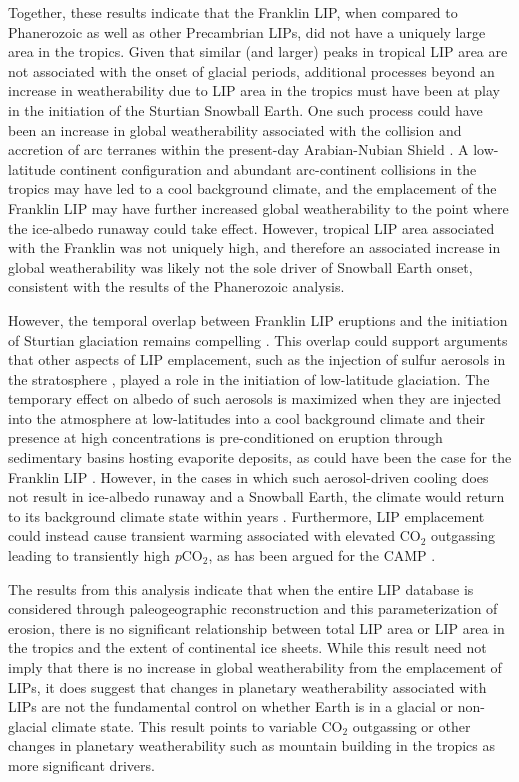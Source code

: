 \documentclass[11pt,letterpaper]{article}
\begin{document}
Together, these results indicate that the Franklin LIP, when compared to Phanerozoic as well as other Precambrian LIPs, did not have a uniquely large area in the tropics. Given that similar (and larger) peaks in tropical LIP area are not associated with the onset of glacial periods, additional processes beyond an increase in weatherability due to LIP area in the tropics must have been at play in the initiation of the Sturtian Snowball Earth. One such process could have been an increase in global weatherability associated with the collision and accretion of arc terranes within the present-day Arabian-Nubian Shield \citep{Park2018a}. A low-latitude continent configuration and abundant arc-continent collisions in the tropics may have led to a cool background climate, and the emplacement of the Franklin LIP may have further increased global weatherability to the point where the ice-albedo runaway could take effect. However, tropical LIP area associated with the Franklin was not uniquely high, and therefore an associated increase in global weatherability was likely not the sole driver of Snowball Earth onset, consistent with the results of the Phanerozoic analysis.

However, the temporal overlap between Franklin LIP eruptions and the initiation of Sturtian glaciation remains compelling \citep{Macdonald2010a, MacLennan2018a}. This overlap could support arguments that other aspects of LIP emplacement, such as the injection of sulfur aerosols in the stratosphere \citep{Macdonald2017a}, played a role in the initiation of low-latitude glaciation. The temporary effect on albedo of such aerosols is maximized when they are injected into the atmosphere at low-latitudes into a cool background climate and their presence at high concentrations is pre-conditioned on eruption through sedimentary basins hosting evaporite deposits, as could have been the case for the Franklin LIP \citep{Macdonald2017a}. However, in the cases in which such aerosol-driven cooling does not result in ice-albedo runaway and a Snowball Earth, the climate would return to its background climate state within years \citep{Macdonald2017a}. Furthermore, LIP emplacement could instead cause transient warming associated with elevated CO$_{2}$ outgassing leading to transiently high \textit{p}CO$_{2}$, as has been argued for the CAMP \citep{Schaller2011a, Schaller2012a}.

The results from this analysis indicate that when the entire LIP database is considered through paleogeographic reconstruction and this parameterization of erosion, there is no significant relationship between total LIP area or LIP area in the tropics and the extent of continental ice sheets. While this result need not imply that there is no increase in global weatherability from the emplacement of LIPs, it does suggest that changes in planetary weatherability associated with LIPs are not the fundamental control on whether Earth is in a glacial or non-glacial climate state. This result points to variable CO$_{2}$ outgassing or other changes in planetary weatherability such as mountain building in the tropics as more significant drivers.
\end{document}
